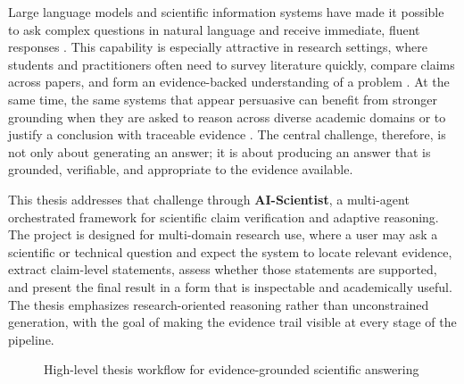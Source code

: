 Large language models and scientific information systems have made it possible to ask complex questions in natural language and receive immediate, fluent responses \cite{devlin2019bert,ouyang2022instructgpt}. This capability is especially attractive in research settings, where students and practitioners often need to survey literature quickly, compare claims across papers, and form an evidence-backed understanding of a problem \cite{lewis2020rag,petroni2019knowledgebases}. At the same time, the same systems that appear persuasive can benefit from stronger grounding when they are asked to reason across diverse academic domains or to justify a conclusion with traceable evidence \cite{ji2023hallucination,huang2023hallucinationsurvey}. The central challenge, therefore, is not only about generating an answer; it is about producing an answer that is grounded, verifiable, and appropriate to the evidence available.

This thesis addresses that challenge through \textbf{AI-Scientist}, a multi-agent orchestrated framework for scientific claim verification and adaptive reasoning. The project is designed for multi-domain research use, where a user may ask a scientific or technical question and expect the system to locate relevant evidence, extract claim-level statements, assess whether those statements are supported, and present the final result in a form that is inspectable and academically useful. The thesis emphasizes research-oriented reasoning rather than unconstrained generation, with the goal of making the evidence trail visible at every stage of the pipeline.

\begin{figure}[H]
\centering
{}
\caption{High-level thesis workflow for evidence-grounded scientific answering}
\end{figure}

